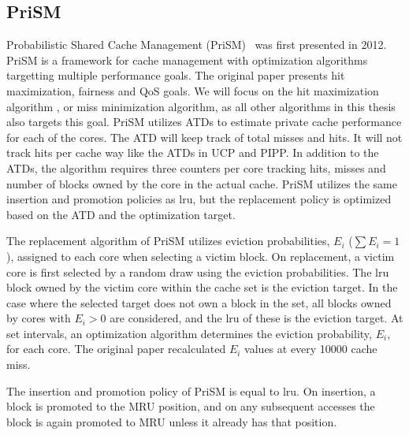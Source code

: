\subsection{PriSM}
\label{sec:algorithms:prism}

Probabilistic Shared Cache Management (PriSM)~\cite{Manikantan2012} was first presented in 2012.
PriSM is a framework for cache management with optimization algorithms targetting multiple performance goals.
The original paper presents hit maximization, fairness and QoS goals.
We will focus on the hit maximization algorithm , or miss minimization algorithm, as all other algorithms in this thesis also targets this goal.
PriSM utilizes ATDs to estimate private cache performance for each of the cores.
The ATD will keep track of total misses and hits.
It will not track hits per cache way like the ATDs in UCP and PIPP.
In addition to the ATDs, the algorithm requires three counters per core tracking hits, misses and number of blocks owned by the core in the actual cache.
PriSM utilizes the same insertion and promotion policies as \gls{lru}, but the replacement policy is optimized based on the ATD and the optimization target.

The replacement algorithm of PriSM utilizes eviction probabilities, $E_i$ ($\sum{E_i} = 1$), assigned to each core when selecting a victim block.
On replacement, a victim core is first selected by a random draw using the eviction probabilities.
The \gls{lru} block owned by the victim core within the cache set is the eviction target.
In the case where the selected target does not own a block in the set, all blocks owned by cores with $E_i > 0$ are considered, and the \gls{lru} of these is the eviction target.
At set intervals, an optimization algorithm determines the eviction probability, $E_i$, for each core.
The original paper recalculated $E_i$ values at every 10000 cache miss.

The insertion and promotion policy of PriSM is equal to \gls{lru}.
On insertion, a block is promoted to the MRU position, and on any subsequent accesses the block is again promoted to MRU unless it already has that position.


